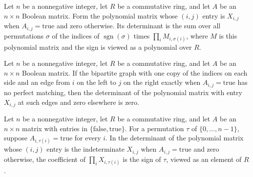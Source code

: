 \begin{theorem}
\label{Randomized.Matching.det_edmondsMatrix_eq_sum}
\leanok
{}
Let $n$ be a nonnegative integer, let $R$ be a commutative ring, and let $A$ be an
$n\times n$ Boolean matrix. Form the polynomial matrix whose $(i,j)$ entry is $X_{i,j}$
when $A_{i,j}=\mathrm{true}$ and zero otherwise. Its determinant is the sum over all
permutations $\sigma$ of the indices of $\operatorname{sgn}(\sigma)$ times $\prod_i
M_{i,\sigma(i)}$, where $M$ is this polynomial matrix and the sign is viewed as a
polynomial over $R$.
\end{theorem}

\begin{theorem}
\label{Randomized.Matching.det_edmondsMatrix_eq_zero}
\leanok
{}
Let $n$ be a nonnegative integer, let $R$ be a commutative ring, and let $A$ be an
$n\times n$ Boolean matrix. If the bipartite graph with one copy of the indices on each
side and an edge from $i$ on the left to $j$ on the right exactly when
$A_{i,j}=\mathrm{true}$ has no perfect matching, then the determinant of the polynomial
matrix with entry $X_{i,j}$ at such edges and zero elsewhere is zero.
\end{theorem}

\begin{theorem}
\label{Randomized.Matching.coeff_det_edmondsMatrix}
\leanok
{}
Let $n$ be a nonnegative integer, let $R$ be a commutative ring, and let $A$ be an
$n\times n$ matrix with entries in $\{\mathrm{false},\mathrm{true}\}$. For a permutation
$\tau$ of $\{0,\ldots,n-1\}$, suppose $A_{i,\tau(i)}=\mathrm{true}$ for every $i$. In
the determinant of the polynomial matrix whose $(i,j)$ entry is the indeterminate
$X_{i,j}$ when $A_{i,j}=\mathrm{true}$ and zero otherwise, the coefficient of $\prod_i
X_{i,\tau(i)}$ is the sign of $\tau$, viewed as an element of $R$.
\end{theorem}

